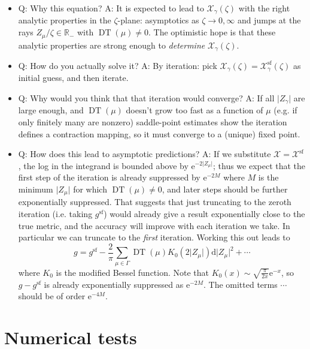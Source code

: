 \documentclass[12pt,letterpaper,reqno]{article}
\numberwithin{equation}{section}
\newcommand{\cX}{\ensuremath{\mathcal X}}
\newcommand{\R}{\ensuremath{\mathbb R}}
\newcommand{\e}{{\mathrm e}}
\newcommand{\de}{\mathrm{d}}
\renewcommand{\sf}{\mathrm{sf}}
\newcommand{\abs}[1]{\lvert#1\rvert}
\newcommand{\ti}[1]{\textit{#1}}
\DeclareMathOperator{\DT}{DT}
\begin{document}
\begin{itemize}
  \item Q: Why this equation? A: It is expected to lead to $\cX_\gamma(\zeta)$ with
  the right analytic properties in the $\zeta$-plane: asymptotics as $\zeta \to 0,\infty$
  and jumps at the rays $Z_\mu / \zeta \in \R_-$ with $\DT(\mu) \neq 0$.
  The optimistic hope is that these analytic properties are strong enough
  to \ti{determine} $\cX_\gamma(\zeta)$.

  \item Q: How do you actually solve it? A: By iteration: pick
  $\cX_\gamma(\zeta) = \cX_\gamma^\sf(\zeta)$ as initial guess, 
  and then iterate.

  \item Q: Why would you think that that iteration would converge?
  A: If all $\abs{Z_\gamma}$ are large enough, and $\DT(\mu)$ doesn't grow too fast
  as a function of $\mu$ (e.g. if only finitely many are nonzero)
  saddle-point estimates show 
  the iteration defines a contraction mapping, so it must
  converge to a (unique) fixed point.

  \item Q: How does this lead to asymptotic predictions? A: 
  If we substitute $\cX = \cX^\sf$, the log in the
  integrand is bounded above by $\e^{-2 \abs{Z_\mu}}$;
  thus we expect that the first step of the iteration is already
  suppressed by $\e^{-2 M}$ where $M$ is the minimum $\abs{Z_\mu}$
  for which $\DT(\mu) \neq 0$, and later steps
  should be further exponentially suppressed. That suggests
  that just truncating to the zeroth iteration (i.e. taking $g^\sf$)
  would already give a result exponentially close to the true metric,
  and the accuracy will improve with each iteration we take.
  In particular we can truncate to the \ti{first} iteration.
  Working this out leads to
  \begin{equation}
    g = g^\sf - \frac{2}{\pi} \sum_{\mu \in \Gamma} \DT(\mu) K_0\left( 2 \abs{Z_\mu} \right) \de \abs{Z_\mu}^2 + \cdots
  \end{equation}
  where $K_0$ is the modified Bessel function.
  Note that $K_0(x) \sim \sqrt{\frac{\pi}{2x}} \e^{-x}$,
  so $g - g^\sf$ is already exponentially suppressed as $\e^{-2M}$.
  The omitted terms $\cdots$ should be of order $\e^{-4M}$.
\end{itemize}

\section{Numerical tests}
\end{document}
